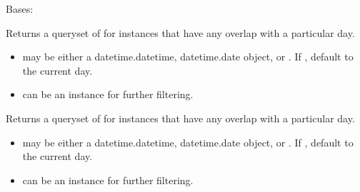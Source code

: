 \documentclass[letterpaper,10pt,english]{sphinxmanual}
\begin{document}
\begin{fulllineitems}
\label{generated/apps.reporting.models:apps.reporting.models.MeetingManager}
Bases: 


\begin{fulllineitems}
\label{generated/apps.reporting.models:apps.reporting.models.MeetingManager.daily_occurrences}
Returns a queryset of for instances that have any overlap with a 
particular day.
\begin{itemize}
\item {} 
 may be either a datetime.datetime, datetime.date object, or
. If , default to the current day.

\item {} 
 can be an  instance for further filtering.

\end{itemize}

\end{fulllineitems}



\begin{fulllineitems}
\label{generated/apps.reporting.models:apps.reporting.models.MeetingManager.monthly_occurrences}
Returns a queryset of for instances that have any overlap with a 
particular day.
\begin{itemize}
\item {} 
 may be either a datetime.datetime, datetime.date object, or
. If , default to the current day.

\item {} 
 can be an  instance for further filtering.

\end{itemize}

\end{fulllineitems}




\end{fulllineitems}
\end{document}
